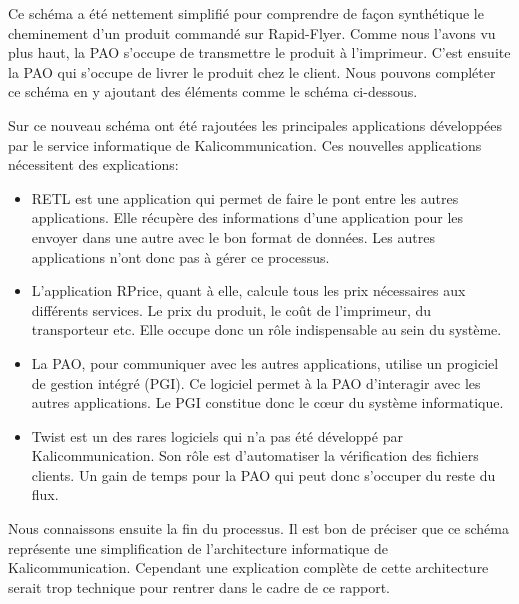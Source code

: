 

Ce schéma a été nettement simplifié pour comprendre de façon synthétique le cheminement d'un produit commandé sur Rapid-Flyer. Comme nous l'avons vu plus haut, la PAO s'occupe de transmettre le produit à l'imprimeur. C'est ensuite la PAO qui s'occupe de livrer le produit chez le client. Nous pouvons compléter ce schéma en y ajoutant des éléments comme le schéma ci-dessous.



Sur ce nouveau schéma ont été rajoutées les principales applications développées par le service informatique de Kalicommunication. Ces nouvelles applications nécessitent des explications:
\begin{itemize}
\item RETL est une application qui permet de faire le pont entre les autres applications. Elle récupère des informations d'une application pour les envoyer dans une autre avec le bon format de données. Les autres applications n'ont donc pas à gérer ce processus.
\item L'application RPrice, quant à elle, calcule tous les prix nécessaires aux différents services. Le prix du produit, le coût de l'imprimeur, du transporteur etc. Elle occupe donc un rôle indispensable au sein du système.
\item La PAO, pour communiquer avec les autres applications, utilise un progiciel de gestion intégré (PGI). Ce logiciel permet à la PAO d'interagir avec les autres applications. Le PGI constitue donc le cœur du système informatique.
\item Twist est un des rares logiciels qui n'a pas été développé par Kalicommunication. Son rôle est d'automatiser la vérification des fichiers clients. Un gain de temps pour la PAO qui peut donc s'occuper du reste du flux.\newline
\end{itemize}
Nous connaissons ensuite la fin du processus. Il est bon de préciser que ce schéma représente une simplification de l'architecture informatique de Kalicommunication. Cependant une explication complète de cette architecture serait trop technique pour rentrer dans le cadre de ce rapport.